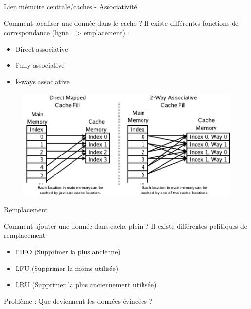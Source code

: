 \begin{frame}{Lien mémoire centrale/caches - Associativité}
	\begin{block}{Comment localiser une donnée dans le cache ?}
		Il existe différentes fonctions de correspondance (ligne => emplacement) :
		\begin{itemize}
			\item{Direct associative}
			\item{Fully associative}
			\item{k-ways associative}
		\end{itemize}
	\end{block}
	\begin{figure}[h!]
		\includegraphics[scale=.33]{images/associative.png}
	\end{figure}
\end{frame}

\begin{frame}{Remplacement}
	\begin{block}{Comment ajouter une donnée dans cache plein ?}
		Il existe différentes politiques de remplacement
		\begin{itemize}
			\item{FIFO (Supprimer la plus ancienne)}
			\item{LFU (Supprimer la moins utilisée)}
			\item{LRU (Supprimer la plus anciennement utilisée)}
		\end{itemize}
	\end{block}
	Problème : Que deviennent les données évincées ?
\end{frame}

